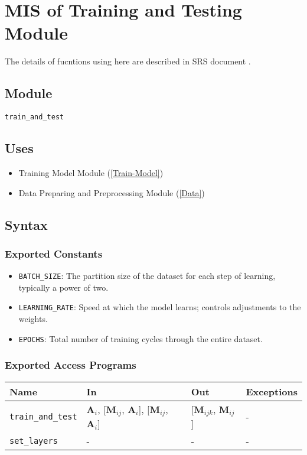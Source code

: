 \documentclass[12pt, titlepage]{article}
\def\code#1{\texttt{#1}}
\begin{document}
\newpage

\section{MIS of Training and Testing Module} \label{Train} 
The details of fucntions using here are described in SRS document \cite{SRS}.
\subsection{Module}
\code{train\_and\_test} 

\subsection{Uses}
\begin{itemize}
  \item Training Model Module (\ref{Train-Model})
  \item Data Preparing and Preprocessing Module (\ref{Data})
\end{itemize}


\subsection{Syntax}
\subsubsection{Exported Constants} \label{Train-Const}
\begin{itemize}
  \item \code{BATCH\_SIZE}: The partition size of the dataset for each step of learning, 
  typically a power of two.
  \item \code{LEARNING\_RATE}: Speed at which the model learns; controls adjustments to the weights.
  \item \code{EPOCHS}: Total number of training cycles through the entire dataset.
\end{itemize}

\subsubsection{Exported Access Programs}

\begin{center}
\begin{tabular}{p{3.5cm} p{5.25cm} p{4cm} p{2cm}}
\hline
\textbf{Name} & \textbf{In} & \textbf{Out} & \textbf{Exceptions} \\
\hline
\code{train\_and\_test} & $\mathbf{A}_{i}$, [$\mathbf{M}_{ij}$, $\mathbf{A}_{i}$], 
[$\mathbf{M}_{ij}$, $\mathbf{A}_{i}$] & [$\mathbf{M}_{ijk}$, $\mathbf{M}_{ij}$]  & -\\
\code{set\_layers} & - & - & -\\
\hline
\end{tabular}
\end{center}
\end{document}
